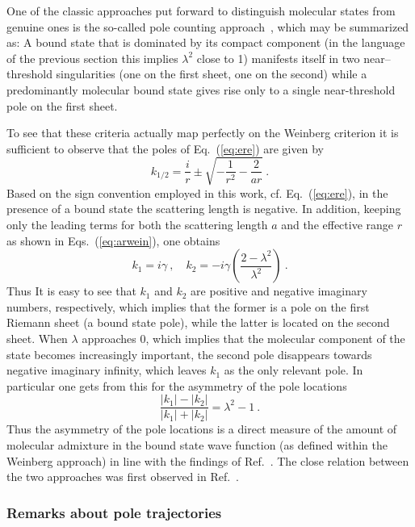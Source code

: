 One of the classic approaches put forward to distinguish molecular states from
genuine ones is the so-called pole counting approach~\cite{Morgan:1992ge},
which may be summarized as: A bound state that is dominated by its compact
component (in the language of the previous section this implies $\lambda^2$
close to 1) manifests itself in two near--threshold singularities (one on the
first sheet, one on the second) while a predominantly molecular bound state
gives rise only to a single near-threshold pole on the first sheet.

To see that these criteria actually map perfectly on the Weinberg criterion it
is sufficient to observe that the poles of Eq.~(\ref{eq:ere}) are given by
\begin{equation}
k_{1/2} = \frac{i}{r} \pm \sqrt{-\frac{1}{r^2}-\frac{2}{ar}} \ .
\end{equation}
{Based on the sign convention employed in this work, cf. Eq.~(\ref{eq:ere}), in the presence of a bound state the scattering length is negative. In
addition, keeping only the leading terms for both the scattering length $a$ and the effective range $r$ as shown in 
Eqs.~(\ref{eq:arwein}), one obtains 
\begin{equation}
k_1 = i\gamma \ , \quad k_2=-i \gamma\left(\frac{2-\lambda^2}{\lambda^2}\right) 
\ .
\end{equation}
Thus
It is easy to see that $k_1$ and $k_2$ are positive and negative 
imaginary numbers, respectively, which implies that the former is a pole on the first Riemann
sheet (a bound state pole), while the latter is located on the second sheet.
When $\lambda$ approaches 0, which implies that the molecular component of the
state becomes increasingly important, the second pole disappears towards negative imaginary infinity,
which leaves $k_1$ as the only relevant pole.
} In particular one gets from this for the asymmetry of the pole locations
\begin{equation}
\frac{|k_1|-|k_2|}{|k_1|+|k_2|} = \lambda^2-1 \ .
\end{equation}
Thus the asymmetry of the pole locations is a direct measure of the amount of 
molecular admixture in the bound state wave function (as defined within the 
Weinberg approach) in line with the findings of Ref.~\cite{Morgan:1992ge}.
The close relation between the two approaches was first observed in 
Ref.~\cite{Baru:2003qq}.



\subsubsection{Remarks about pole trajectories}
\label{sec:poletrajectories}

